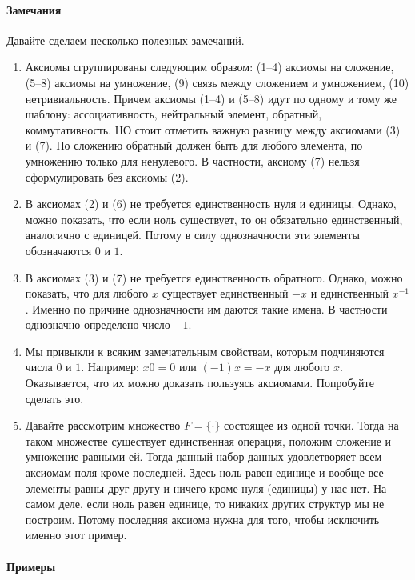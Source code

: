 \paragraph{Замечания}

Давайте сделаем несколько полезных замечаний.
\begin{enumerate}
\item Аксиомы сгруппированы следующим образом: (1--4) аксиомы на сложение, (5--8) аксиомы на умножение, (9) связь между сложением и умножением, (10) нетривиальность. Причем аксиомы (1--4) и (5--8) идут по одному и тому же шаблону: ассоциативность, нейтральный элемент, обратный, коммутативность. НО стоит отметить важную разницу между аксиомами (3) и (7). По сложению обратный должен быть для любого элемента, по умножению только для ненулевого. В частности, аксиому (7) нельзя сформулировать без аксиомы (2).

\item В аксиомах (2) и (6) не требуется единственность нуля и единицы. Однако, можно показать, что если ноль существует, то он обязательно единственный, аналогично с единицей. Потому в силу однозначности эти элементы обозначаются $0$ и $1$.

\item В аксиомах (3) и (7) не требуется единственность обратного. Однако, можно показать, что для любого $x$ существует единственный $-x$ и единственный $x^{-1}$. Именно по причине однозначности им даются такие имена. В частности однозначно определено число $-1$.

\item Мы привыкли к всяким замечательным свойствам, которым подчиняются числа $0$ и $1$. Например: $x 0 = 0$ или $(-1)x = -x$ для любого $x$. Оказывается, что их можно доказать пользуясь аксиомами. Попробуйте сделать это.

\item Давайте рассмотрим множество $F=\{\cdot\}$ состоящее из одной точки. Тогда на таком множестве существует единственная операция, положим сложение и умножение равными ей. Тогда данный набор данных удовлетворяет всем аксиомам поля кроме последней. Здесь ноль равен единице и вообще все элементы равны друг другу и ничего кроме  нуля (единицы) у нас  нет. На самом деле, если ноль равен единице, то никаких других структур мы не построим. Потому последняя аксиома нужна для того, чтобы исключить именно этот пример.

\end{enumerate}

\paragraph{Примеры}

